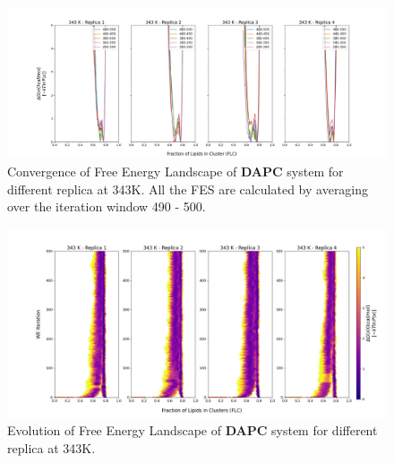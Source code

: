 \documentclass{biophys-new}
\begin{document}
\begin{figure}[hbt!]
\centering
\includegraphics[width=1.1\linewidth]{all_plots/ClusterLipids2Total/DPPC_DAPC_CHOL/343K/Convergence_DAPC_343_ClusterLipids2Total.png}
\caption{Convergence of Free Energy Landscape of \textbf{DAPC} system for different replica at 343K. All the FES are calculated by averaging over the iteration window 490 - 500.}
\label{fig:view}

\end{figure}

\begin{figure}[hbt!]
\centering
\includegraphics[width=1.1\linewidth]{all_plots/ClusterLipids2Total/DPPC_DAPC_CHOL/343K/Evolution_DAPC_343_ClusterLipids2Total.png}
\caption{Evolution of Free Energy Landscape of \textbf{DAPC} system for different replica at 343K.}
\label{fig:view}

\end{figure}
\end{document}
